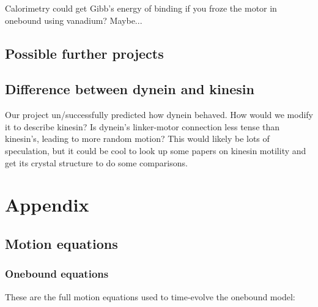 \documentclass[10pt]{article} %
\begin{document}
Calorimetry could get Gibb's energy of binding if you froze the motor in onebound using
vanadium? Maybe...\\
\subsection{Possible further projects}
\subsection{Difference between dynein and kinesin}
Our project un/successfully predicted how dynein behaved. How would we modify it to describe kinesin?
Is dynein's linker-motor connection less tense than kinesin's, leading to more random motion? This
would likely be lots of speculation, but it could be cool to look up some papers on kinesin motility
and get its crystal structure to do some comparisons.




\section{Appendix}

\subsection{Motion equations}

\subsubsection{Onebound equations}
\label{onebound-motion-equations}
These are the full motion equations used to time-evolve the onebound model:
\end{document}
